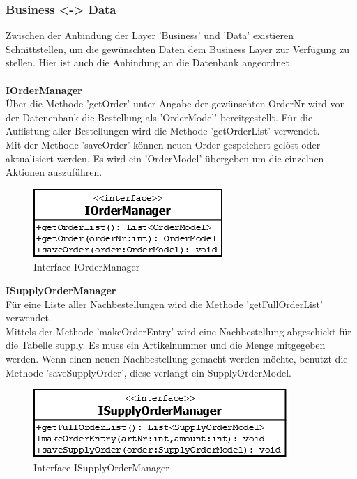 \clearpage
\subsubsection{Business <-> Data}

Zwischen der Anbindung der Layer 'Business' und 'Data' existieren Schnittstellen, um die gewünschten Daten dem Business Layer zur Verfügung zu stellen. Hier ist auch die Anbindung an die Datenbank angeordnet\\\\

\textbf{IOrderManager}\\
Über die Methode 'getOrder' unter Angabe der gewünschten OrderNr wird von der Datenenbank die Bestellung als 'OrderModel' bereitgestellt. Für die Auflistung aller Bestellungen wird die Methode 'getOrderList' verwendet.\\
Mit der Methode 'saveOrder' können neuen Order gespeichert gelöst oder aktualisiert werden. Es wird ein 'OrderModel' übergeben um die einzelnen Aktionen auszuführen. 
\begin{figure}[H]
	\includegraphics[width=0.3\linewidth]{Images/IOrderManager}
	\caption{Interface IOrderManager}
	\label{fig:if-IOrderManager}
\end{figure}


\textbf{ISupplyOrderManager}\\
Für eine Liste aller Nachbestellungen wird die Methode 'getFullOrderList' verwendet.\\
Mittels der Methode 'makeOrderEntry' wird eine Nachbestellung abgeschickt für die Tabelle supply. Es muss ein Artikelnummer und die Menge mitgegeben werden. Wenn einen neuen Nachbestellung gemacht werden möchte, benutzt die Methode 'saveSupplyOrder', diese verlangt ein SupplyOrderModel.
\begin{figure}[H]
	\includegraphics[width=0.4\linewidth]{Images/ISupplyOrderManager}
	\caption{Interface ISupplyOrderManager}
	\label{fig:if-ISupplyOrderManager}
\end{figure}



